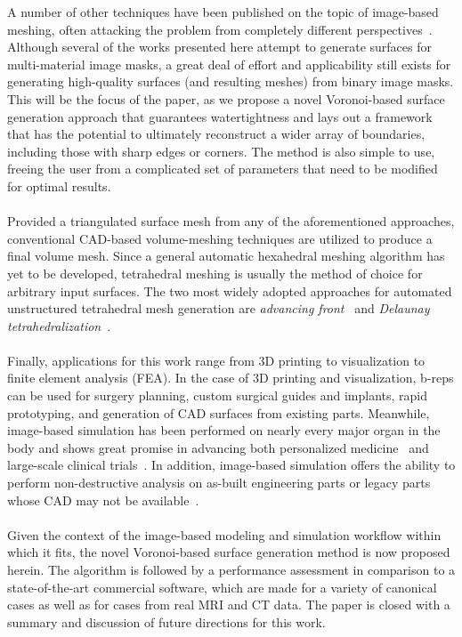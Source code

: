 %
A number of other techniques have been published on the topic of image-based meshing, often attacking the problem from completely different perspectives~\cite{fang_2009, mohamed_2004, jermyn_2013, boissonnat_2009}. Although several of the works presented here attempt to generate surfaces for multi-material image masks, a great deal of effort and applicability still exists for generating high-quality surfaces (and resulting meshes) from binary image masks. This will be the focus of the paper, as we propose a novel Voronoi-based surface generation approach that guarantees watertightness and lays out a framework that has the potential to ultimately reconstruct a wider array of boundaries, including those with sharp edges or corners. The method is also simple to use, freeing the user from a complicated set of parameters that need to be modified for optimal results. \\ \\
%
Provided a triangulated surface mesh from any of the aforementioned approaches, conventional CAD-based volume-meshing techniques are utilized to produce a final volume mesh. Since a general automatic hexahedral meshing algorithm has yet to be developed, tetrahedral meshing is usually the method of choice for arbitrary input surfaces. The two most widely adopted approaches for automated unstructured tetrahedral mesh generation are \textit{advancing front}~\cite{jin_1993, lohner_1988} and \textit{Delaunay tetrahedralization}~\cite{lohner_1997}. \\ \\
%
Finally, applications for this work range from 3D printing to visualization to finite element analysis (FEA). In the case of 3D printing and visualization, b-reps can be used for surgery planning, custom surgical guides and implants, rapid prototyping, and generation of CAD surfaces from existing parts. Meanwhile, image-based simulation has been performed on nearly every major organ in the body and shows great promise in advancing both personalized medicine~\cite{neal2010current} and large-scale clinical trials~\cite{viceconti2016silico}. In addition, image-based simulation offers the ability to perform non-destructive analysis on as-built engineering parts or legacy parts whose CAD may not be available~\cite{bradley2005advances}.\\ \\
%
Given the context of the image-based modeling and simulation workflow within which it fits, the novel Voronoi-based surface generation method is now proposed herein. The algorithm is followed by a performance assessment in comparison to a state-of-the-art commercial software, which are made for a variety of canonical cases as well as for cases from real MRI and CT data. The paper is closed with a summary and discussion of future directions for this work.
